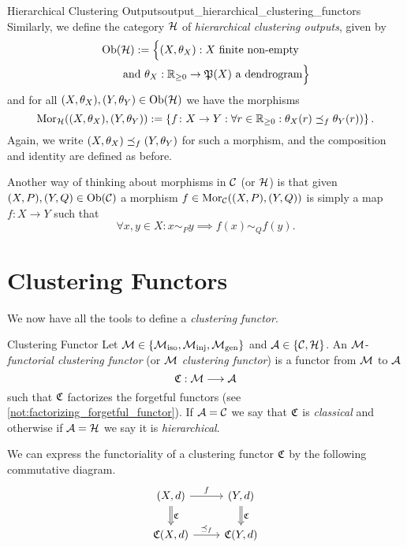 \begin{definition}{Hierarchical Clustering Outputs\cite[Def.~3.3]{Carlsson2010}}{output_hierarchical_clustering_functors}
Similarly, we define the category $\mathcal{H}$ of \emph{hierarchical clustering outputs}, given by
\begin{equation*}
\begin{multlined}[c][.8\displaywidth]
    \ob(\H) := \Big\{(X, \theta_X): X \text{ finite non-empty} \\ \text{and } \theta_X: \R_{\geq0} \to \P(X) \ \text{a dendrogram}\Big\}
\end{multlined}
\end{equation*}
and for all $(X, \theta_X), (Y, \theta_Y) \in \mathrm {Ob}(\mathcal{H})$ we have the morphisms
\begin{equation*}
    \mathrm {Mor}_{\mathcal{H}}((X, \theta_X), (Y,\theta_Y)) :=
    \left\{f\colon X \to Y: \forall r \in \mathbb R_{\geq0}: \theta_X(r) \preceq_f \theta_Y(r)) \right\}.
\end{equation*}
Again, we write $(X, \theta_X) \preceq_f (Y, \theta_Y)$ for such a morphism, and the composition and identity are defined as before.
\end{definition}

Another way of thinking about morphisms in $\mathcal{C}$ (or $\mathcal{H}$) is that given ${(X,P), (Y,Q) \in \mathrm {Ob}(\mathcal{C})}$ a morphism $f \in \mathrm {Mor}_{\mathcal{C}}((X,P), (Y,Q))$ is simply a map $f\colon X \to Y$ such that
$$
\forall x,y \in X: x \sim_P y \implies f(x) \sim_Q f(y).
$$

\section{Clustering Functors}
We now have all the tools to define a \emph{clustering functor}.

\begin{definition}{Clustering Functor \cite[Sec.~4.1]{Carlsson2010}}{}
Let $\mathcal{M} \in \{{\mathcal{M}_\mathrm{iso}}, {\mathcal{M}_\mathrm{inj}}, {\mathcal{M}_\mathrm{gen}}\}$ and $\mathcal{A} \in \{\mathcal{C}, \mathcal{H}\}$. An $\mathcal{M}$-\emph{functorial clustering functor} (or $\mathcal{M}$ \emph{clustering functor}) is a functor from $\mathcal{M}$ to $\mathcal{A}$
$$\mathfrak{C} : \mathcal{M} \longrightarrow \mathcal{A}$$
such that $\mathfrak{C}$ factorizes the forgetful functors (see \ref{not:factorizing_forgetful_functor}). If $\mathcal{A} = \mathcal{C}$ we say that $\mathfrak{C}$ is \emph{classical} and otherwise if $\mathcal{A} = \mathcal{H}$ we say it is \emph{hierarchical}.
\end{definition}

We can express the functoriality of a clustering functor $\mathfrak{C}$ by the following commutative diagram.
\begin{equation*}
    \begin{tikzcd}
    {(X,d)} \arrow[r, "f"] \arrow[d, "\Cf", Rightarrow] & {(Y,d)} \arrow[d, "\Cf", Rightarrow] \\
    {\Cf(X,d)} \arrow[r, "\refines_f"]                  & {\Cf(Y,d)}
    \end{tikzcd}
\end{equation*}

